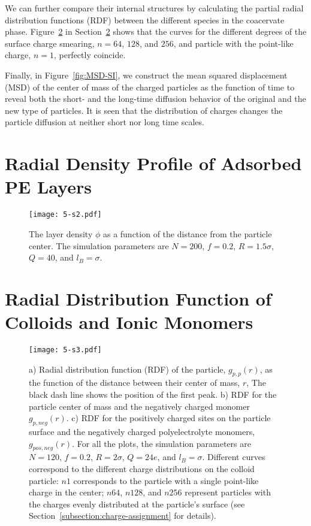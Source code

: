\documentclass[journal=mamobx, manuscript=article]{achemso}
\begin{document}
We can further compare their internal structures by calculating the partial radial distribution functions (RDF) between the different species in the coacervate phase. Figure~\ref{fig:rdf} in Section~\ref{subsection:rdf} shows that the curves for the different degrees of the surface charge smearing, $n = 64$, $128$, and $256$, and particle with the point-like charge, $n=1$, perfectly coincide. 


Finally, in Figure~\ref{fig:MSD-SI}, we construct the mean squared displacement (MSD) of the center of mass of the charged particles as the function of time to reveal both the short- and the long-time diffusion behavior of the original and the new type of particles. It is seen that the distribution of charges changes the particle diffusion at neither short nor long time scales.





\newpage

\section{Radial Density Profile of Adsorbed PE Layers}
\label{subsection:distribution}

\begin{figure}%
\centering
\texttt{[image: 5-s2.pdf]}
\caption{The layer density $\phi$ as a function of the distance from the particle center. The simulation parameters are $N = 200$, $f = 0.2$, $R = 1.5\sigma$, $ Q = 40$, and $l_{B} = \sigma$.}
\label{fig:distri}
\end{figure}




\newpage

\section{Radial Distribution Function of Colloids and Ionic Monomers}
\label{subsection:rdf}

\begin{figure}[ht]
\centering
\texttt{[image: 5-s3.pdf]}
\caption{
a) Radial distribution function (RDF) of the particle, $g_{p, p}(r)$, as the function of the distance between their center of mass, $r$,  The black dash line shows the position of the first peak. 
b) RDF for the particle center of mass and the negatively charged monomer $g_{p, neg}(r)$.  
c) RDF for the positively charged sites on the particle surface and the negatively charged polyelectrolyte monomers, $g_{pos, neg}(r)$.
For all the plots, the simulation parameters are $N = 120$, $f = 0.2$, $R = 2\sigma$, $Q = 24e$, and $l_{B} = \sigma$. Different curves correspond to the different charge distributions on the colloid particle: $n1$ corresponds to the particle with a single point-like charge in the center; $n64$, $n128$, and $n256$ represent particles with the charges evenly distributed at the particle's surface (see Section~\ref{subsection:charge-assignment} for details).
}
\label{fig:rdf}
\end{figure}
\end{document}
